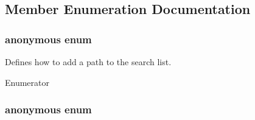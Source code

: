\subsection{Member Enumeration Documentation}
\hypertarget{classcmn_path_ac052729bcebb4fcdcef7eaaa81c21ab9}{\subsubsection[{anonymous enum}]{\setlength{\rightskip}{0pt plus 5cm}anonymous enum}}\label{classcmn_path_ac052729bcebb4fcdcef7eaaa81c21ab9}
Defines how to add a path to the search list. \begin{Desc}
\item[Enumerator]\par
\begin{description}
\item[{\em 
\hypertarget{classcmn_path_ac052729bcebb4fcdcef7eaaa81c21ab9a53c54bb785ea4ed82a051ce4508f152a}{H\-E\-A\-D}\label{classcmn_path_ac052729bcebb4fcdcef7eaaa81c21ab9a53c54bb785ea4ed82a051ce4508f152a}
}]\item[{\em 
\hypertarget{classcmn_path_ac052729bcebb4fcdcef7eaaa81c21ab9ae473342fccc1ae9e6812eb4e3c192352}{T\-A\-I\-L}\label{classcmn_path_ac052729bcebb4fcdcef7eaaa81c21ab9ae473342fccc1ae9e6812eb4e3c192352}
}]\end{description}
\end{Desc}
\hypertarget{classcmn_path_a15dacf9562d80d5b7eb9b849726e768c}{\subsubsection[{anonymous enum}]{\setlength{\rightskip}{0pt plus 5cm}anonymous enum}}\label{classcmn_path_a15dacf9562d80d5b7eb9b849726e768c}
